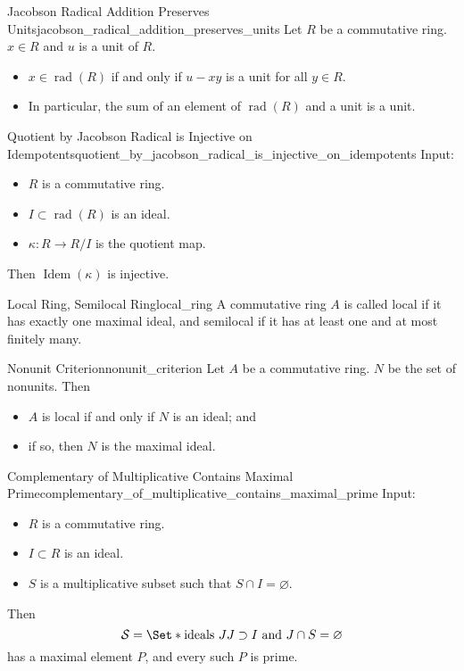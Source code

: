 \documentclass{article}
\begin{document}
\begin{proposition}{Jacobson Radical Addition Preserves Units}{jacobson_radical_addition_preserves_units}
    Let $R$ be a commutative ring.
    $x\in R$ and $u$ is a unit of $R$.
    \begin{itemize}
        \item $x\in\operatorname{rad}(R)$ if and only if $u - xy$ is a unit for all $y\in R$.
        \item In particular, the sum of an element of $\operatorname{rad}(R)$ and a unit is a unit.
    \end{itemize}
\end{proposition}

\begin{proposition}{Quotient by Jacobson Radical is Injective on Idempotents}{quotient_by_jacobson_radical_is_injective_on_idempotents}
    Input:
    \begin{itemize}
        \item $R$ is a commutative ring.
        \item $I\subset \operatorname{rad}(R)$ is an ideal.
        \item $\kappa: R\rightarrow R/I$ is the quotient map.
    \end{itemize}
    Then $\operatorname{Idem}(\kappa)$ is injective.
\end{proposition}

\begin{definition}{Local Ring, Semilocal Ring}{local_ring}
    A commutative ring $A$ is called local if it has exactly one maximal ideal, and semilocal if it has at least one and at most finitely many.
\end{definition}

\begin{lemma}{Nonunit Criterion}{nonunit_criterion}
    Let $A$ be a commutative ring.
    $N$ be the set of nonunits.
    Then
    \begin{itemize}
        \item $A$ is local if and only if $N$ is an ideal; and
        \item if so, then $N$ is the maximal ideal.
    \end{itemize}
\end{lemma}

\begin{proposition}{Complementary of Multiplicative Contains Maximal Prime}{complementary_of_multiplicative_contains_maximal_prime}
    Input:
    \begin{itemize}
        \item $R$ is a commutative ring.
        \item $I\subset R$ is an ideal.
        \item $S$ is a multiplicative subset such that $S\cap I = \varnothing$.
    \end{itemize}
    Then
    \[ \mathcal{S} = \Set*{\text{ideals } J}{J\supset I \text{ and } J\cap S = \varnothing} \]
    has a maximal element $P$, and every such $P$ is prime.
\end{proposition}
\end{document}
